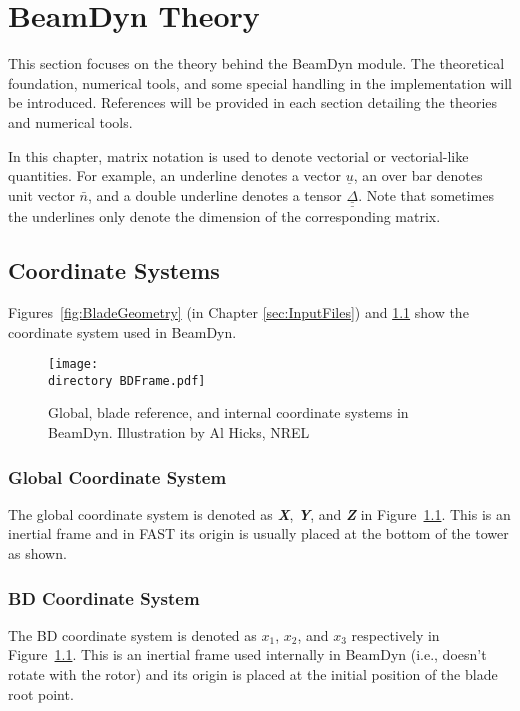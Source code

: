\chapter{BeamDyn Theory}
\label{sec:Theory}

This section focuses on the theory behind the BeamDyn module. 
The theoretical foundation, numerical tools, and some special handling in the implementation will be introduced. References will be provided in each section detailing the theories and numerical tools.


In this chapter, matrix notation is used to denote vectorial or vectorial-like quantities. 
For example, an underline denotes a vector $\underline{u}$, an over bar denotes unit vector $\bar{n}$, and a double underline denotes a tensor $\underline{\underline{\Delta}}$. 
Note that sometimes the underlines only denote the dimension of the corresponding matrix.

\section{Coordinate Systems}
Figures~\ref{fig:BladeGeometry} (in Chapter \ref{sec:InputFiles}) and \ref{fig:BDFrame}  show the coordinate system used in BeamDyn.
\begin{figure}[h!tp]
    \centering
    \texttt{[image: \\directory BDFrame.pdf]}
    \caption{Global, blade reference, and internal coordinate systems in BeamDyn. Illustration by Al Hicks, NREL}
    \label{fig:BDFrame}
\end{figure}

\subsection{Global Coordinate System}
The global coordinate system is denoted as \textbf{ {\it X}}, \textbf{ {\it Y}}, and \textbf{ {\it Z}} in Figure~\ref{fig:BDFrame}. 
This is an inertial frame and in FAST its origin is usually placed at the bottom of the tower as shown.

\subsection{BD Coordinate System}
The BD coordinate system is denoted as $x_1$, $x_2$, and $x_3$ respectively in Figure~\ref{fig:BDFrame}. 
This is an inertial frame used internally in BeamDyn (i.e., doesn't rotate with the rotor) and its origin is placed at the initial position of the blade root point.

